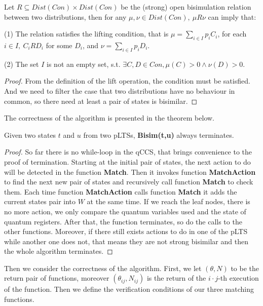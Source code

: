 \documentclass[runningheads]{llncs}
\begin{document}
\begin{theorem}

Let $\textit{R}\subseteq Dist(Con)\times Dist(Con)$ be the (strong) open bisimulation relation between two distributions, then for any $\mu,\nu\in Dist(Con),\ \mu\textit{R}\nu$ can imply that:
\begin{item}
\item[(1)] The relation satisfies the lifting condition, that is $\mu=\sum_{i\in I}p_i\textit{C}_i$, for each $i\in I,\ \textit{C}_i\textit{R}\textit{D}_i$ for some $\textit{D}_i$, and $\nu=\sum_{i\in I}p_i\textit{D}_i$.
\item[(2)] The set $I$ is not an empty set, s.t. $\exists C,D\in Con, \mu(C)>0\wedge\nu(D)>0$.
\end{item}
\end{theorem} 
\begin{proof}
From the definition of the lift operation, the condition must be satisfied. And we need to filter the case that two distributions have no behaviour in common, so there need at least a pair of states is bisimilar.
\end{proof}
The correctness of the algorithm is presented in the theorem below.
\begin{theorem}[Termination]

Given two states $t$ and $u$ from two pLTSs, \textbf{Bisim(t,u)} always terminates.
\end{theorem} 
\begin{proof}
So far there is no while-loop in the qCCS, that brings convenience to the proof of termination. Starting at the initial pair of states, the next action to do will be detected in the function \textbf{Match}. Then it invokes function \textbf{MatchAction} to find the next new pair of states and recursively call function \textbf{Match} to check them. Each time function \textbf{MatchAction} calls function \textbf{Match} it adds the current states pair into $W$ at the same time. If we reach the leaf nodes, there is no more action, we only compare the quantum variables used and the state of quantum registers. After that, the function terminates, so do the calls to the other functions. Moreover, if there still exists actions to do in one of the pLTS while another one does not, that means they are not strong bisimilar and then the whole algorithm terminates. 
\end{proof}
Then we consider the correctness of the algorithm. First, we let $(\theta, N)$ to be the return pair of functions, moreover $(\theta_{ij}, N_{ij})$ is the return of the $i\cdot j$-th execution of the function. Then we define the verification conditions of our three matching functions.
\end{document}
